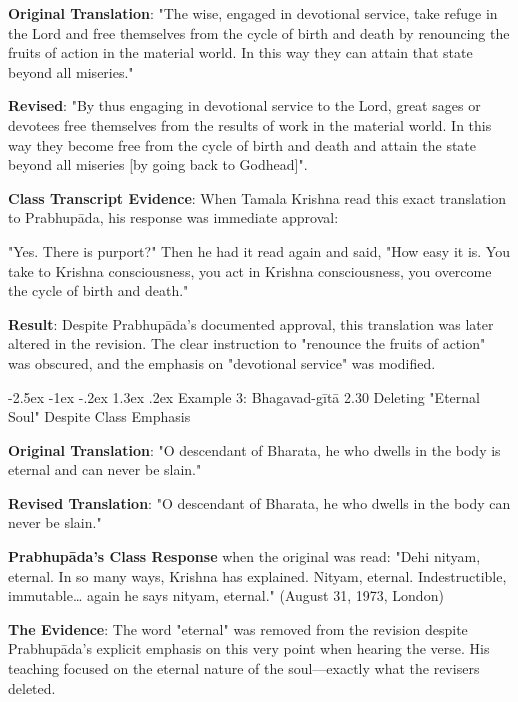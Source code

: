 \documentclass[12pt,twoside]{book}
\makeatletter
\renewcommand\section{\@startsection{section}{1}{\z@}%
{-2.5ex \@plus -1ex \@minus -.2ex}%
{1.3ex \@plus.2ex}%
{\normalfont\Large\bfseries}}
\makeatother
\begin{document}
\textbf{\textbf{Original Translation}}: "The wise, engaged in devotional service, take refuge in the Lord and free themselves from the cycle of birth and death by renouncing the fruits of action in the material world. In this way they can attain that state beyond all miseries."

\textbf{\textbf{Revised}}: "By thus engaging in devotional service to the Lord, great sages or devotees free themselves from the results of work in the material world. In this way they become free from the cycle of birth and death and attain the state beyond all miseries [by going back to Godhead]".

\textbf{\textbf{Class Transcript Evidence}}: When Tamala Krishna read this exact translation to Prabhupāda, his response was immediate approval:

"Yes. There is purport?" Then he had it read again and said, "How easy it is. You take to Krishna consciousness, you act in Krishna consciousness, you overcome the cycle of birth and death." 

\textbf{\textbf{Result}}: Despite Prabhupāda's documented approval, this translation was later altered in the revision. The clear instruction to "renounce the fruits of action" was obscured, and the emphasis on "devotional service" was modified.

\vspace{-0.3cm}
\section{Example 3: Bhagavad-gītā 2.30}
\label{sec:org3da26ac}
Deleting "Eternal Soul" Despite Class Emphasis

\textbf{\textbf{Original Translation}}: "O descendant of Bharata, he who dwells in the body is eternal and can never be slain."

\textbf{\textbf{Revised Translation}}: "O descendant of Bharata, he who dwells in the body can never be slain."

\textbf{\textbf{Prabhupāda's Class Response}} when the original was read:
"Dehi nityam, eternal. In so many ways, Krishna has explained. Nityam, eternal. Indestructible, immutable\ldots{} again he says nityam, eternal." (August 31, 1973, London)

\textbf{\textbf{The Evidence}}: The word "eternal" was removed from the revision despite Prabhupāda's explicit emphasis on this very point when hearing the verse. His teaching focused on the eternal nature of the soul—exactly what the revisers deleted.
\end{document}
